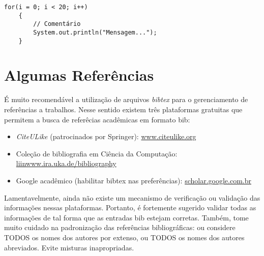 \begin{lstlisting}[frame=trbl]
    for(i = 0; i < 20; i++)
    {
        // Comentário 
        System.out.println("Mensagem...");
    }
\end{lstlisting}


\section{Algumas Referências}
\label{sec:algumas_referencias}

É muito recomendável a utilização de arquivos \emph{bibtex} para o gerenciamento
de referências a trabalhos. Nesse sentido existem três plataformas gratuitas
que permitem a busca de referêcias acadêmicas em formato bib: 
\begin{itemize}
	\item \emph{CiteULike} (patrocinados por Springer): \url{www.citeulike.org}
	\item Coleção de bibliografia em Ciência da Computação: \url{liinwww.ira.uka.de/bibliography}
	\item Google acadêmico (habilitar bibtex nas preferências): \url{scholar.google.com.br}
\end{itemize}
Lamentavelmente, ainda não existe um mecanismo de verificação ou validação das
informações nessas plataformas. Portanto, é fortemente sugerido validar todas
as informações de tal forma que as entradas bib estejam corretas.  Também, tome
muito cuidado na padronização das referências bibliográficas: ou considere TODOS
os nomes dos autores por extenso, ou TODOS os nomes dos autores abreviados.
Evite misturas inapropriadas.

